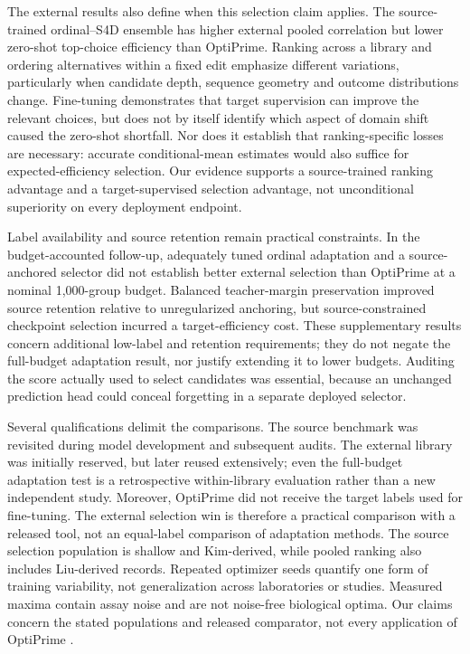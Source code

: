 The external results also define when this selection claim applies. The source-trained ordinal--S4D ensemble has higher external pooled correlation but lower zero-shot top-choice efficiency than OptiPrime. Ranking across a library and ordering alternatives within a fixed edit emphasize different variations, particularly when candidate depth, sequence geometry and outcome distributions change. Fine-tuning demonstrates that target supervision can improve the relevant choices, but does not by itself identify which aspect of domain shift caused the zero-shot shortfall. Nor does it establish that ranking-specific losses are necessary: accurate conditional-mean estimates would also suffice for expected-efficiency selection. Our evidence supports a source-trained ranking advantage and a target-supervised selection advantage, not unconditional superiority on every deployment endpoint.

Label availability and source retention remain practical constraints. In the budget-accounted follow-up, adequately tuned ordinal adaptation and a source-anchored selector did not establish better external selection than OptiPrime at a nominal 1,000-group budget. Balanced teacher-margin preservation improved source retention relative to unregularized anchoring, but source-constrained checkpoint selection incurred a target-efficiency cost. These supplementary results concern additional low-label and retention requirements; they do not negate the full-budget adaptation result, nor justify extending it to lower budgets. Auditing the score actually used to select candidates was essential, because an unchanged prediction head could conceal forgetting in a separate deployed selector.

Several qualifications delimit the comparisons. The source benchmark was revisited during model development and subsequent audits. The external library was initially reserved, but later reused extensively; even the full-budget adaptation test is a retrospective within-library evaluation rather than a new independent study. Moreover, OptiPrime did not receive the target labels used for \model{} fine-tuning. The external selection win is therefore a practical comparison with a released tool, not an equal-label comparison of adaptation methods. The source selection population is shallow and Kim-derived, while pooled ranking also includes Liu-derived records. Repeated optimizer seeds quantify one form of training variability, not generalization across laboratories or studies. Measured maxima contain assay noise and are not noise-free biological optima. Our claims concern the stated populations and released comparator, not every application of OptiPrime \citep{hsu2026}.

